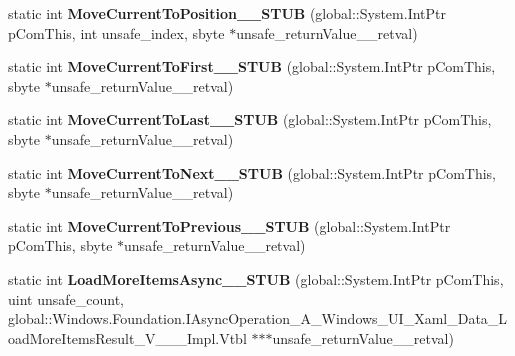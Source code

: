 \begin{DoxyCompactItemize}
static int {\bfseries Move\+Current\+To\+Position\+\_\+\+\_\+\+S\+T\+UB} (global\+::\+System.\+Int\+Ptr p\+Com\+This, int unsafe\+\_\+index, sbyte $\ast$unsafe\+\_\+return\+Value\+\_\+\+\_\+retval)
\item 
\mbox{\label{struct_windows_1_1_u_i_1_1_xaml_1_1_data_1_1_i_collection_view_____impl_1_1_vtbl_a9dfef5457d014e6deffc3bafd87be8bf}} 
static int {\bfseries Move\+Current\+To\+First\+\_\+\+\_\+\+S\+T\+UB} (global\+::\+System.\+Int\+Ptr p\+Com\+This, sbyte $\ast$unsafe\+\_\+return\+Value\+\_\+\+\_\+retval)
\item 
\mbox{\label{struct_windows_1_1_u_i_1_1_xaml_1_1_data_1_1_i_collection_view_____impl_1_1_vtbl_a52e8e47bad9fe0ee5b821399f8a80575}} 
static int {\bfseries Move\+Current\+To\+Last\+\_\+\+\_\+\+S\+T\+UB} (global\+::\+System.\+Int\+Ptr p\+Com\+This, sbyte $\ast$unsafe\+\_\+return\+Value\+\_\+\+\_\+retval)
\item 
\mbox{\label{struct_windows_1_1_u_i_1_1_xaml_1_1_data_1_1_i_collection_view_____impl_1_1_vtbl_ac0151651e7f0d4cc8fc00cf3ebd04d76}} 
static int {\bfseries Move\+Current\+To\+Next\+\_\+\+\_\+\+S\+T\+UB} (global\+::\+System.\+Int\+Ptr p\+Com\+This, sbyte $\ast$unsafe\+\_\+return\+Value\+\_\+\+\_\+retval)
\item 
\mbox{\label{struct_windows_1_1_u_i_1_1_xaml_1_1_data_1_1_i_collection_view_____impl_1_1_vtbl_a40d697dc01d277bfd4de18a4df9523fe}} 
static int {\bfseries Move\+Current\+To\+Previous\+\_\+\+\_\+\+S\+T\+UB} (global\+::\+System.\+Int\+Ptr p\+Com\+This, sbyte $\ast$unsafe\+\_\+return\+Value\+\_\+\+\_\+retval)
\item 
\mbox{\label{struct_windows_1_1_u_i_1_1_xaml_1_1_data_1_1_i_collection_view_____impl_1_1_vtbl_a911856c8fea3c3fe419b9d6c4c19ac81}} 
static int {\bfseries Load\+More\+Items\+Async\+\_\+\+\_\+\+S\+T\+UB} (global\+::\+System.\+Int\+Ptr p\+Com\+This, uint unsafe\+\_\+count, global\+::\+Windows.\+Foundation.\+I\+Async\+Operation\+\_\+\+A\+\_\+\+Windows\+\_\+\+U\+I\+\_\+\+Xaml\+\_\+\+Data\+\_\+\+Load\+More\+Items\+Result\+\_\+\+V\+\_\+\+\_\+\+\_\+\+Impl.\+Vtbl $\ast$$\ast$$\ast$unsafe\+\_\+return\+Value\+\_\+\+\_\+retval)

\end{DoxyCompactItemize}
